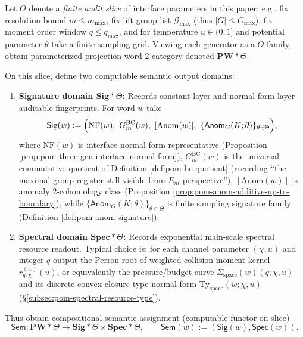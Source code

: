\begin{definition}\label{def:pom-conservative-sem-functor}
Let \(\Theta\) denote a \emph{finite audit slice} of interface parameters in this paper: e.g., fix resolution bound \(m\le m_{\max}\), fix lift group list \(\mathcal{G}_{\max}\) (thus \(|G|\le G_{\max}\)), fix moment order window \(q\le q_{\max}\), and for temperature \(u\in(0,1]\) and potential parameter \(\theta\) take a finite sampling grid.
Viewing each generator as a \(\Theta\)-family, obtain parameterized projection word \(2\)-category denoted \(\mathbf{PW}*\Theta\).
\par
On this slice, define two computable semantic output domains:
\begin{enumerate}
  \item \textbf{Signature domain \(\mathbf{Sig}*\Theta\):} Records constant-layer and normal-form-layer auditable fingerprints. For word \(w\) take
  \[
  \mathsf{Sig}(w):=\Bigl(\mathrm{NF}(w),\ G^{\mathrm{BC}}_m(w),\ [\mathrm{Anom}(w)],\ \{\mathsf{Anom}_{G}(K;\theta)\}_{\theta\in\Theta}\Bigr),
  \]
  where \(\mathrm{NF}(w)\) is interface normal form representative (Proposition \ref{prop:pom-three-gen-interface-normal-form}),
  \(G^{\mathrm{BC}}_m(w)\) is the universal commutative quotient of Definition \ref{def:pom-bc-quotient} (recording ``the maximal group register still visible from \(E_m\) perspective''),
  \([\mathrm{Anom}(w)]\) is anomaly \(2\)-cohomology class (Proposition \ref{prop:pom-anom-additive-up-to-boundary}),
  while \(\{\mathsf{Anom}_{G}(K;\theta)\}_{\theta\in\Theta}\) is finite sampling signature family (Definition \ref{def:pom-anom-signature}).
  \item \textbf{Spectral domain \(\mathbf{Spec}*\Theta\):} Records exponential main-scale spectral resource readout. Typical choice is: for each channel parameter \((\chi,u)\) and integer \(q\) output the Perron root of weighted collision moment-kernel
  \(r^{(w)}_{q,\chi}(u)\), or equivalently the pressure/budget curve \(\Sigma_{\mathrm{space}}(w)(q;\chi,u)\) and its discrete convex closure type normal form \(\mathrm{Ty}_{\mathrm{space}}(w;\chi,u)\) (\S\ref{subsec:pom-spectral-resource-type}).
\end{enumerate}
Thus obtain compositional semantic assignment (computable functor on slice)
\[
\boxed{\;
\mathsf{Sem}:\mathbf{PW}*\Theta\longrightarrow \mathbf{Sig}*\Theta\times \mathbf{Spec}*\Theta,\qquad
\mathsf{Sem}(w):=(\mathsf{Sig}(w),\mathsf{Spec}(w)).\;}
\]
\end{definition}

